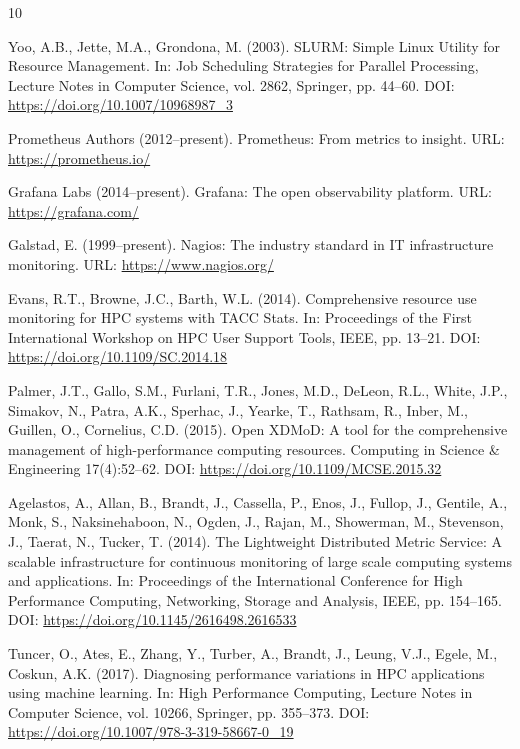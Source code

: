 \documentclass[11pt,a4paper]{article}
\begin{document}
\begin{thebibliography}{10}

Yoo, A.B., Jette, M.A., Grondona, M. (2003). SLURM: Simple Linux Utility for Resource Management. In: Job Scheduling Strategies for Parallel Processing, Lecture Notes in Computer Science, vol. 2862, Springer, pp. 44--60. DOI: \url{https://doi.org/10.1007/10968987_3}

Prometheus Authors (2012--present). Prometheus: From metrics to insight.
URL: \url{https://prometheus.io/}

Grafana Labs (2014--present). Grafana: The open observability platform.
URL: \url{https://grafana.com/}

Galstad, E. (1999--present). Nagios: The industry standard in IT
infrastructure monitoring. URL: \url{https://www.nagios.org/}

Evans, R.T., Browne, J.C., Barth, W.L. (2014). Comprehensive resource use monitoring for HPC systems with TACC Stats. In: Proceedings of the First International Workshop on HPC User Support Tools, IEEE, pp. 13--21. DOI: \url{https://doi.org/10.1109/SC.2014.18}

Palmer, J.T., Gallo, S.M., Furlani, T.R., Jones, M.D., DeLeon, R.L., White, J.P., Simakov, N., Patra, A.K., Sperhac, J., Yearke, T., Rathsam, R., Inber, M., Guillen, O., Cornelius, C.D. (2015). Open XDMoD: A tool for the comprehensive management of high-performance computing resources. Computing in Science \& Engineering 17(4):52--62. DOI: \url{https://doi.org/10.1109/MCSE.2015.32}

Agelastos, A., Allan, B., Brandt, J., Cassella, P., Enos, J., Fullop, J., Gentile, A., Monk, S., Naksinehaboon, N., Ogden, J., Rajan, M., Showerman, M., Stevenson, J., Taerat, N., Tucker, T. (2014). The Lightweight Distributed Metric Service: A scalable infrastructure for continuous monitoring of large scale computing systems and applications. In: Proceedings of the International Conference for High Performance Computing, Networking, Storage and Analysis, IEEE, pp. 154--165. DOI: \url{https://doi.org/10.1145/2616498.2616533}

Tuncer, O., Ates, E., Zhang, Y., Turber, A., Brandt, J., Leung, V.J.,
Egele, M., Coskun, A.K. (2017). Diagnosing performance variations in HPC
applications using machine learning. In: High Performance Computing,
Lecture Notes in Computer Science, vol. 10266, Springer, pp. 355--373.
DOI: \url{https://doi.org/10.1007/978-3-319-58667-0_19}


\end{thebibliography}
\end{document}
